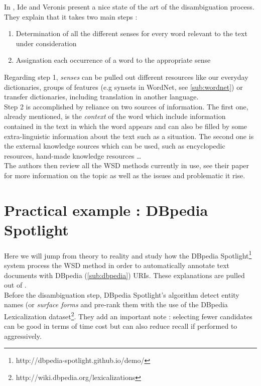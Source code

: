 In \cite{ide1998introduction}, Ide and Veronis present a nice state of the art of the disambiguation process. They explain that it takes two main steps :
\begin{enumerate}
 	\item Determination of all the different senses for every word relevant to the text under consideration
 	\item Assignation each occurrence of a word to the appropriate sense
\end{enumerate} 
Regarding step 1, \textit{senses} can be pulled out different resources like our everyday dictionaries, groups of features (e.g synsets in WordNet, see \ref{sub:wordnet}) or transfer dictionaries, including translation in another language.\\
Step 2 is accomplished by reliance on two sources of information. The first one, already mentioned, is the \textit{context} of the word which include information contained in the text in which the word appears and can also be filled by some extra-linguistic information about the text such as a situation. The second one is the external knowledge sources which can be used, such as encyclopedic resources, hand-made knowledge resources \dots\\

The authors then review all the WSD methods currently in use, see their paper for more information on the topic as well as the issues and problematic it rise.

\section{Practical example : DBpedia Spotlight} %
\label{sec:dbpedia_spotlight}
Here we will jump from theory to reality and study how the DBpedia Spotlight\footnote{http://dbpedia-spotlight.github.io/demo/} system process the WSD method in order to automatically annotate text documents with DBpedia (\ref{sub:dbpedia}) URIs. These explanations are pulled out of \cite{mendes2011dbpedia}.\\

Before the disambiguation step, DBpedia Spotlight's algorithm detect entity names (or \textit{surface forms} and pre-rank them with the use of the DBpedia Lexicalization dataset\footnote{http://wiki.dbpedia.org/lexicalizations}. They add an important note : selecting fewer candidates can be good in terms of time cost but can also reduce recall if performed to aggressively.\\

